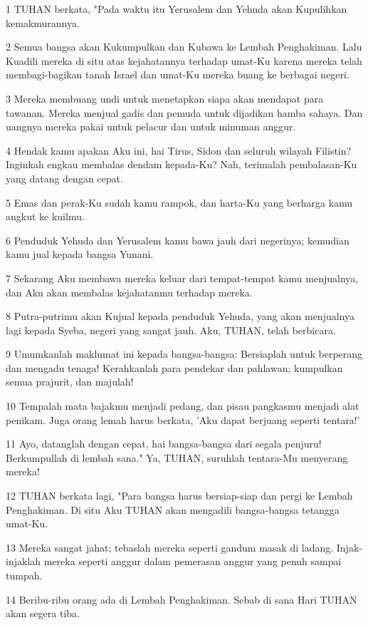 \par 1 TUHAN berkata, "Pada waktu itu Yerusalem dan Yehuda akan Kupulihkan kemakmurannya.
\par 2 Semua bangsa akan Kukumpulkan dan Kubawa ke Lembah Penghakiman. Lalu Kuadili mereka di situ atas kejahatannya terhadap umat-Ku karena mereka telah membagi-bagikan tanah Israel dan umat-Ku mereka buang ke berbagai negeri.
\par 3 Mereka membuang undi untuk menetapkan siapa akan mendapat para tawanan. Mereka menjual gadis dan pemuda untuk dijadikan hamba sahaya. Dan uangnya mereka pakai untuk pelacur dan untuk minuman anggur.
\par 4 Hendak kamu apakan Aku ini, hai Tirus, Sidon dan seluruh wilayah Filistin? Inginkah engkau membalas dendam kepada-Ku? Nah, terimalah pembalasan-Ku yang datang dengan cepat.
\par 5 Emas dan perak-Ku sudah kamu rampok, dan harta-Ku yang berharga kamu angkut ke kuilmu.
\par 6 Penduduk Yehuda dan Yerusalem kamu bawa jauh dari negerinya; kemudian kamu jual kepada bangsa Yunani.
\par 7 Sekarang Aku membawa mereka keluar dari tempat-tempat kamu menjualnya, dan Aku akan membalas kejahatanmu terhadap mereka.
\par 8 Putra-putrimu akan Kujual kepada penduduk Yehuda, yang akan menjualnya lagi kepada Syeba, negeri yang sangat jauh. Aku, TUHAN, telah berbicara.
\par 9 Umumkanlah maklumat ini kepada bangsa-bangsa: Bersiaplah untuk berperang dan mengadu tenaga! Kerahkanlah para pendekar dan pahlawan; kumpulkan semua prajurit, dan majulah!
\par 10 Tempalah mata bajakmu menjadi pedang, dan pisau pangkasmu menjadi alat penikam. Juga orang lemah harus berkata, 'Aku dapat berjuang seperti tentara!'
\par 11 Ayo, datanglah dengan cepat, hai bangsa-bangsa dari segala penjuru! Berkumpullah di lembah sana." Ya, TUHAN, suruhlah tentara-Mu menyerang mereka!
\par 12 TUHAN berkata lagi, "Para bangsa harus bersiap-siap dan pergi ke Lembah Penghakiman. Di situ Aku TUHAN akan mengadili bangsa-bangsa tetangga umat-Ku.
\par 13 Mereka sangat jahat; tebaslah mereka seperti gandum masak di ladang. Injak-injaklah mereka seperti anggur dalam pemerasan anggur yang penuh sampai tumpah.
\par 14 Beribu-ribu orang ada di Lembah Penghakiman. Sebab di sana Hari TUHAN akan segera tiba.
